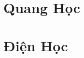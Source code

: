\documentclass{article}
\numberwithin{equation}{section}
\begin{document}

\section{Quang Học}


\section{Điện Học}


\printbibliography[heading=bibintoc]
	
\end{document}
